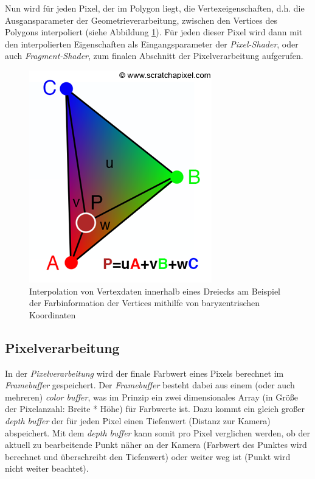 \documentclass[oneside]{ausarbeitung}
\begin{document}
Nun wird für jeden Pixel, der im Polygon liegt, die Vertexeigenschaften, d.h. die Ausgansparameter der Geometrieverarbeitung, zwischen den Vertices des Polygons interpoliert (siehe Abbildung \ref{fig:barycentric_color}). Für jeden dieser Pixel wird dann mit den interpolierten Eigenschaften als Eingangsparameter der \textit{Pixel-Shader}, oder auch \textit{Fragment-Shader}, zum finalen Abschnitt der Pixelverarbeitung aufgerufen. 

\begin{figure}
    \includegraphics[scale=1]{images/barycentriccolor.png}
    \caption{Interpolation von Vertexdaten innerhalb eines Dreiecks am Beispiel der Farbinformation der Vertices mithilfe von baryzentrischen Koordinaten \cite{scratchapixel:barycentric_color}}
    \label{fig:barycentric_color}
\end{figure}

\subsection{Pixelverarbeitung}
In der \textit{Pixelverarbeitung} wird der finale Farbwert eines Pixels berechnet im \textit{Framebuffer} gespeichert. Der \textit{Framebuffer} besteht dabei aus einem (oder auch mehreren) \textit{color buffer}, was im Prinzip ein zwei dimensionales Array (in Größe der Pixelanzahl: Breite * Höhe) für Farbwerte ist. Dazu kommt ein gleich großer \textit{depth buffer} der für jeden Pixel einen Tiefenwert (Distanz zur Kamera) abspeichert. Mit dem \textit{depth buffer} kann somit pro Pixel verglichen werden, ob der aktuell zu bearbeitende Punkt näher an der Kamera (Farbwert des Punktes wird berechnet und überschreibt den Tiefenwert) oder weiter weg ist (Punkt wird nicht weiter beachtet).
\end{document}
